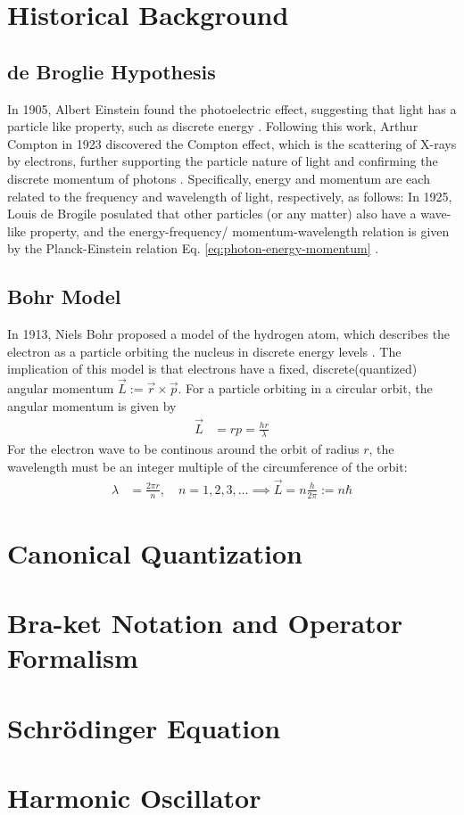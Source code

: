 \section{Historical Background}
\subsection{de Broglie Hypothesis}
In 1905, Albert Einstein found the photoelectric effect, suggesting that light has a particle like property, such as discrete energy
\cite{1905-photoelectric}.
Following this work, Arthur Compton in 1923 discovered the Compton effect, which is the scattering of X-rays by electrons, further supporting the particle nature of light and confirming the discrete momentum of photons
\cite{1923-compton}.
Specifically, energy and momentum are each related to the frequency and wavelength of light, respectively, as follows:
In 1925, Louis de Brogile posulated that other particles (or any matter) also have a wave-like property, and the energy-frequency/ momentum-wavelength relation is given by the Planck-Einstein relation Eq. \eqref{eq:photon-energy-momentum} \cite{1925-deBroglie}.

\subsection{Bohr Model}
In 1913, Niels Bohr proposed a model of the hydrogen atom, which describes the electron as a particle orbiting the nucleus in discrete energy levels \cite{1913-bohr}.
The implication of this model is that electrons have a fixed, discrete(quantized) angular momentum $\vec{L} := \vec{r} \times \vec{p}$.
For a particle orbiting in a circular orbit, the angular momentum is given by
\begin{align}
  \vec{L} & = r p = \frac{h r}{\lambda}
\end{align}
For the electron wave to be continous around the orbit of radius $r$, the wavelength must be an integer multiple of the circumference of the orbit:
\begin{align}
  \lambda & = \frac{2 \pi r}{n}, \quad n = 1, 2, 3, \ldots \implies \vec{L} = n \frac{h}{2 \pi} := n \hbar
\end{align}


\section{Canonical Quantization}


\section{Bra-ket Notation and Operator Formalism}


\section{Schrödinger Equation}

\section{Harmonic Oscillator}